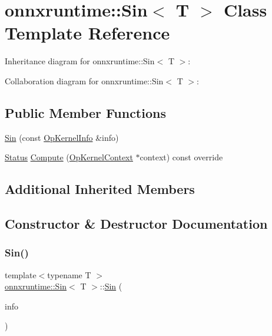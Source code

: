 \hypertarget{classonnxruntime_1_1Sin}{}\section{onnxruntime\+:\+:Sin$<$ T $>$ Class Template Reference}
\label{classonnxruntime_1_1Sin}


Inheritance diagram for onnxruntime\+:\+:Sin$<$ T $>$\+:


Collaboration diagram for onnxruntime\+:\+:Sin$<$ T $>$\+:
\subsection*{Public Member Functions}
\begin{DoxyCompactItemize}
\item 
\mbox{\hyperlink{classonnxruntime_1_1Sin_a9df40c94d1b69f6508442d2551754fc4}{Sin}} (const \mbox{\hyperlink{classonnxruntime_1_1OpKernelInfo}{Op\+Kernel\+Info}} \&info)
\item 
\mbox{\hyperlink{classonnxruntime_1_1common_1_1Status}{Status}} \mbox{\hyperlink{classonnxruntime_1_1Sin_a0627e01dab1e7af1e2b5ed19a35b09d1}{Compute}} (\mbox{\hyperlink{classonnxruntime_1_1OpKernelContext}{Op\+Kernel\+Context}} $\ast$context) const override
\end{DoxyCompactItemize}
\subsection*{Additional Inherited Members}


\subsection{Constructor \& Destructor Documentation}
\mbox{\label{classonnxruntime_1_1Sin_a9df40c94d1b69f6508442d2551754fc4}} 
\subsubsection{\texorpdfstring{Sin()}{Sin()}}
{\footnotesize\ttfamily template$<$typename T $>$ \\
\mbox{\hyperlink{classonnxruntime_1_1Sin}{onnxruntime\+::\+Sin}}$<$ T $>$\+::\mbox{\hyperlink{classonnxruntime_1_1Sin}{Sin}} (\begin{DoxyParamCaption}\item[{const \mbox{\hyperlink{classonnxruntime_1_1OpKernelInfo}{Op\+Kernel\+Info}} \&}]{info }\end{DoxyParamCaption})\hspace{0.3cm}{\ttfamily [inline]}}



